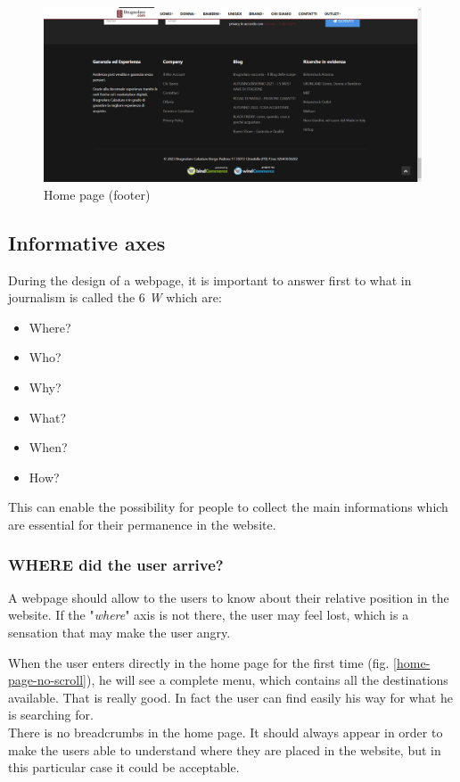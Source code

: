 \begin{figure}[!h] 
    \centering 
    \includegraphics[scale = 0.29]{images/hp_scroll3.png} 
    \caption{Home page (footer)}
    \label{home-page-scroll-3}
\end{figure}

\subsection{Informative axes}
\label{6w}
During the design of a webpage, it is important to answer first
to what in journalism is called the 6 \textit{W} which are:
\begin{itemize}
    \item Where?
    \item Who?
    \item Why?
    \item What?
    \item When?
    \item How?
\end{itemize}
This can enable the possibility for people to collect the main informations which are
essential for their permanence in the website.
\subsubsection{WHERE did the user arrive?}
A webpage should allow to the users to know about their relative position
in the website. If the "\textit{where}" axis is not there,
the user may feel lost, which is a sensation that may make the user angry.

When the user enters directly in the home page for the first time (fig. \ref{home-page-no-scroll}), he will see a
complete menu, which contains all the destinations available. That is
really good. In fact the user can find easily his way for what he is searching for.\\
There is no breadcrumbs in the home page. It should always appear in order
to make the users able to understand where they are placed in the website, but in this
particular case it could be acceptable.

